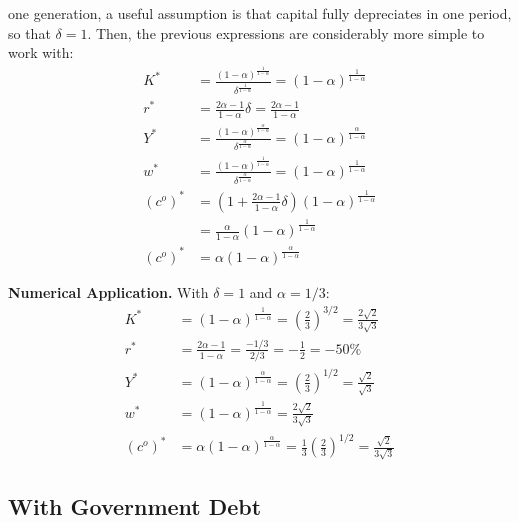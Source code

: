 \documentclass[]{book}
\theoremstyle{definition}
\theoremstyle{definition}
\theoremstyle{definition}
\theoremstyle{remark}
\begin{document}
one generation, a useful assumption is that capital fully depreciates in
one period, so that \(\delta = 1\). Then, the previous expressions are
considerably more simple to work with: \[
\begin{aligned}
K^{*}&=\frac{(1-\alpha)^{\frac{1}{1-\alpha}}}{\delta^{\frac{1}{1-\alpha}}}=(1-\alpha)^{\frac{1}{1-\alpha}}\\
r^{*}&=\frac{2\alpha-1}{1-\alpha}\delta = \frac{2\alpha-1}{1-\alpha}\\
Y^{*}&=\frac{(1-\alpha)^{\frac{\alpha}{1-\alpha}}}{\delta^{\frac{\alpha}{1-\alpha}}} = (1-\alpha)^{\frac{\alpha}{1-\alpha}}\\
w^{*} &= \frac{\left(1-\alpha\right)^{\frac{1}{1-\alpha}}}{\delta^{\frac{\alpha}{1-\alpha}}} = (1-\alpha)^{\frac{1}{1-\alpha}}\\
(c^{o})^{*}&=\left(1+ \frac{2\alpha-1}{1-\alpha}\delta\right)\left(1-\alpha\right)^{\frac{1}{1-\alpha}}\\
&=\frac{\alpha}{1-\alpha}\left(1-\alpha\right)^{\frac{1}{1-\alpha}}\\
(c^{o})^{*}&= \alpha\left(1-\alpha\right)^{\frac{\alpha}{1-\alpha}}
\end{aligned}
\]

\textbf{Numerical Application.} With \(\delta = 1\) and
\(\alpha = 1/3\): \[
\begin{aligned}
K^{*}&=(1-\alpha)^{\frac{1}{1-\alpha}}=\left(\frac{2}{3}\right)^{3/2}=\frac{2\sqrt{2}}{3\sqrt{3}}\\
r^{*}&=\frac{2\alpha-1}{1-\alpha}=\frac{-1/3}{2/3}=-\frac{1}{2}=-50\%\\
Y^{*}&=(1-\alpha)^{\frac{\alpha}{1-\alpha}} = \left(\frac{2}{3}\right)^{1/2}=\frac{\sqrt{2}}{\sqrt{3}}\\
w^{*}&=\left(1-\alpha\right)^{\frac{1}{1-\alpha}} =\frac{2\sqrt{2}}{3\sqrt{3}}\\
(c^{o})^{*}&=\alpha\left(1-\alpha\right)^{\frac{\alpha}{1-\alpha}}=\frac{1}{3} \left(\frac{2}{3}\right)^{1/2}=\frac{\sqrt{2}}{3\sqrt{3}}
\end{aligned}
\]

\subsection{With Government Debt}\label{with-government-debt}
\end{document}
